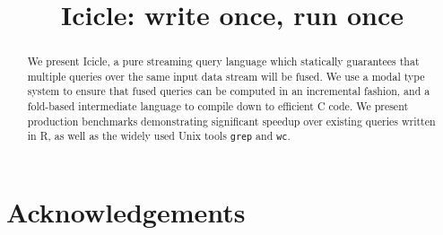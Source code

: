 \documentclass[preprint]{sigplanconf}
\begin{document}
\doi{}

\title{Icicle: write once, run once}


\maketitle
\makeatactive

\begin{abstract}
We present Icicle, a pure streaming query language which statically guarantees that multiple queries over the same input data stream will be fused. We use a modal type system to ensure that fused queries can be computed in an incremental fashion, and a fold-based intermediate language to compile down to efficient C code. We present production benchmarks demonstrating significant speedup over existing queries written in R, as well as the widely used Unix tools \texttt{grep} and \texttt{wc}.

\end{abstract}







% 


\section*{Acknowledgements}



\end{document}
